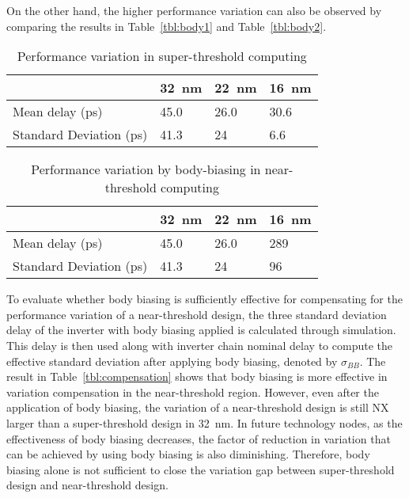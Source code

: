 On the other hand, the higher performance variation can also be observed by comparing the results in Table~\ref{tbl:body1} and Table~\ref{tbl:body2}. 

\begin{table}
  \caption{Performance variation in super-threshold computing} 
  \centering 
  \label{tbl:body3}
  \begin{tabular}{ | l | l | l | l | }
    \hline
    & \SI{32}{\nano\meter} & \SI{22}{\nano\meter} & \SI{16}{\nano\meter} \\ \hline
    Mean delay (ps) & 45.0 & 26.0 & 30.6 \\ \hline
    Standard Deviation (ps)  & 41.3 & 24 & 6.6 \\  \hline
    \hline
  \end{tabular}
\end{table}



\begin{table}
  \caption {Performance variation by body-biasing in near-threshold computing}  
  \centering
  \label{tbl:body4}
  \begin{tabular}{ | l | l | l | l | }
    \hline
    & \SI{32}{\nano\meter} & \SI{22}{\nano\meter} & \SI{16}{\nano\meter} \\ \hline
    Mean delay (ps) & 45.0 & 26.0 & 289 \\ \hline
    Standard Deviation (ps)  & 41.3 & 24 & 96 \\  \hline
    \hline
  \end{tabular}
\end{table}

To evaluate whether body biasing is sufficiently effective for compensating for the performance variation of a near-threshold design, the three standard deviation delay of the inverter with body biasing applied is calculated through simulation.
This delay is then used along with inverter chain nominal delay to compute the effective standard deviation after applying body biasing, denoted by $\sigma_{BB}$.
The result in Table~\ref{tbl:compensation} shows that body biasing is more effective in variation compensation in the near-threshold region.
However, even after the application of body biasing, the variation of a near-threshold design is still NX larger than a super-threshold  design in \SI{32}{\nano\meter}.
In future technology nodes, as the effectiveness of body biasing decreases, the factor of reduction in variation that can be achieved by using body biasing is also diminishing.
Therefore, body biasing alone is not sufficient to close the variation gap between super-threshold design and near-threshold design.
   

